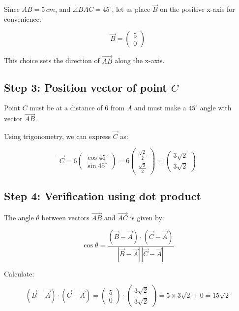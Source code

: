 \documentclass[journal]{IEEEtran}
\begin{document}
Since $AB = 5\,cm$, and $\angle BAC = 45^\circ$, let us place $\vec{B}$ on the positive x-axis for convenience:

\[
\vec{B} = \begin{pmatrix}5 \\ 0\end{pmatrix}
\]

This choice sets the direction of $\vec{AB}$ along the x-axis.

\subsection*{\textbf{Step} 3: Position vector of point $C$}

Point $C$ must be at a distance of 6 from $A$ and must make a $45^\circ$ angle with vector $\vec{AB}$.

Using trigonometry, we can express $\vec{C}$ as:

\[
\vec{C} = 6 \begin{pmatrix} \cos 45^\circ \\ \sin 45^\circ \end{pmatrix} 
= 6 \begin{pmatrix} \frac{\sqrt{2}}{2} \\ \frac{\sqrt{2}}{2} \end{pmatrix}
= \begin{pmatrix} 3\sqrt{2} \\ 3\sqrt{2} \end{pmatrix}
\]

\subsection*{\textbf{Step} 4: Verification using dot product}

The angle $\theta$ between vectors $\vec{AB}$ and $\vec{AC}$ is given by:

\[
\cos \theta = \frac{(\vec{B}-\vec{A}) \cdot (\vec{C}-\vec{A})}{|\vec{B}-\vec{A}| \, |\vec{C}-\vec{A}|}
\]

Calculate:

\[
(\vec{B}-\vec{A}) \cdot (\vec{C}-\vec{A}) = \begin{pmatrix}5 \\ 0\end{pmatrix} \cdot \begin{pmatrix}3\sqrt{2} \\ 3\sqrt{2}\end{pmatrix} = 5 \times 3\sqrt{2} + 0 = 15\sqrt{2}
\]
\end{document}

